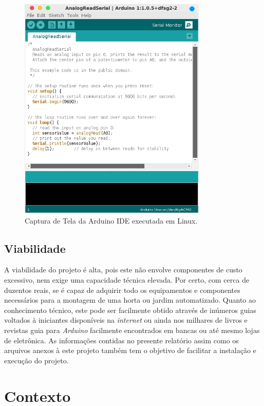 \documentclass[a4paper,12pt]{article}
\begin{document}
\begin{figure}[!ht]
	\centering
		\includegraphics[width=0.8\textwidth]{arduinoIDE.jpg}
		\caption{Captura de Tela da Arduino IDE executada em Linux.}
\end{figure}

\subsection{Viabilidade}

A viabilidade do projeto é alta, pois este não envolve componentes de custo excessivo, nem exige uma capacidade técnica elevada. Por certo, com cerca de duzentos reais, se é capaz de adquirir todo os equipamentos e componentes necessários para a montagem de uma horta ou jardim automatizado. Quanto ao conhecimento técnico, este pode ser facilmente obtido através de inúmeros guias voltados à iniciantes disponíveis na \textit{internet} ou ainda nos milhares de livros e revistas guia para \textit{Arduino} facilmente encontrados em bancas ou até mesmo lojas de eletrônica. As informações contidas no presente relatório assim como os arquivos anexos à este projeto também tem o objetivo de facilitar a instalação e execução do projeto.



\section{Contexto}
\end{document}
